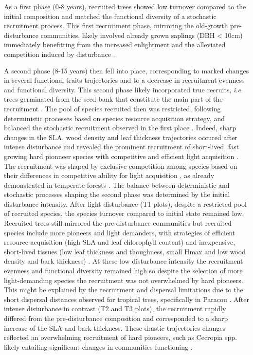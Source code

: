 \documentclass[fleqn,10pt]{ArtEcoFoG} %
\begin{document}
As a first phase (0-8 years), recruited trees showed low turnover
compared to the initial composition and matched the functional diversity
of a stochastic recruitment process. This first recruitment phase,
mirroring the old-growth pre-disturbance communities, likely involved
already grown saplings (DBH \textless{} 10cm) immediately benefitting
from the increased enlightment and the alleviated competition induced by
disturbance \citep{Herault2010}.

A second phase (8-15 years) then fell into place, corresponding to
marked changes in several functional traits trajectories and to a
decrease in recruitment evenness and functional diversity. This second
phase likely incorporated true recruits, \emph{i.e.} trees germinated
from the seed bank that constitute the main part of the recruitment
\citep{Lawton1988}. The pool of species recruited then was restricted,
following deterministic processes based on species resource acquisition
strategy, and balanced the stochastic recruitment observed in the first
place \citep{Chave2004}. Indeed, sharp changes in the SLA, wood density
and leaf thickness trajectories occured after intense disturbance and
revealed the prominent recruitment of short-lived, fast growing hard
pionneer species with competitive and efficient light acquisition
\citep{Wright2004, Chave2009b, Herault2011, Reich2014}.\\
The recruitment was shaped by exclusive competition among species based
on their differences in competitive ability for light acquisition
\citep{Mayfield2010}, as already demonstrated in temperate forests
\citep{Kunstler2012}. The balance between deterministic and stochastic
processes shaping the second phase was determined by the initial
disturbance intensity. After light disturbance (T1 plots), despite a
restricted pool of recruited species, the species turnover compared to
initial state remained low. Recruited trees still mirrored the
pre-disturbance communities but recruited species include more pioneers
and light demanders, with strategies of efficient resource acquisition
(high SLA and leaf chlorophyll content) and inexpensive, short-lived
tissues (low leaf thickness and thoughness, small Hmax and low wood
density and bark thickness)
\citep{Hubbell1999, Schnitzer2001, Sheil2003, Bongers2009}. At these low
disturbance intensity the recruitment evenness and functional diversity
remained high so despite the selection of more light-demanding species
the recruitment was not overwhelmed by hard pioneers. This might be
explained by the recruitment and dispersal limitations due to the short
dispersal distances observed for tropical trees, specifically in Paracou
\citep{Leclerc2015, Scotti2015a}. After intense disturbance in contrast
(T2 and T3 plots), the recruitment rapidly differed from the
pre-disturbance composition and corresponded to a sharp increase of the
SLA and bark thickness. These drastic trajectories changes reflected an
overwhelming recruitment of hard pioneers, such as Cecropia spp. likely
entailing significant changes in communities functioning
\citep{Diaz2005}.
\end{document}
